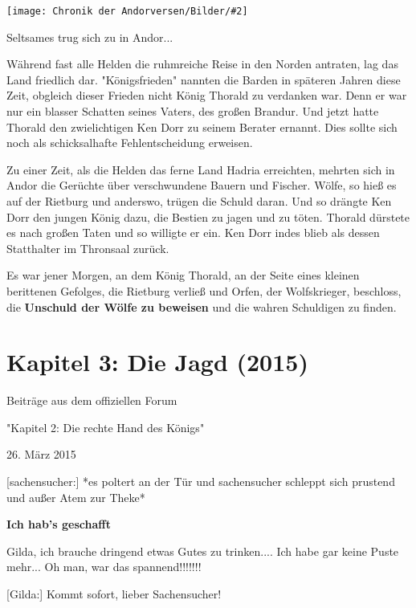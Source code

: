 \documentclass[10pt, a4paper, oneside]{book}
\newcommand{\fillbreak}{\vspace*{\fill}\columnbreak}
\newcommand{\storytext}[1]{%
    \section{#1}%
    \label{Storytext: #1}%
}
\newcommand{\bildmitts}[2][height=0.32\textwidth,width=0.48\textwidth,keepaspectratio]{%
    \begin{center}
        \texttt{[image: Chronik der Andorversen/Bilder/\#2]}
    \end{center}
}
\begin{document}
\begin{multicols}{2}
\bildmitts{AA2015 Die Jagd 1.jpeg}



Seltsames trug sich zu in Andor...\bigskip

Während fast alle Helden die ruhmreiche Reise in den Norden antraten, lag das Land friedlich dar. "Königsfrieden" nannten die Barden in späteren Jahren diese Zeit, obgleich dieser Frieden nicht König Thorald zu verdanken war. Denn er war nur ein blasser Schatten seines Vaters, des großen Brandur. Und jetzt hatte Thorald den zwielichtigen Ken Dorr zu seinem Berater ernannt. Dies sollte sich noch als schicksalhafte Fehlentscheidung erweisen.\bigskip

Zu einer Zeit, als die Helden das ferne Land Hadria erreichten, mehrten sich in Andor die Gerüchte über verschwundene Bauern und Fischer. Wölfe, so hieß es auf der Rietburg und anderswo, trügen die Schuld daran. Und so drängte Ken Dorr den jungen König dazu, die Bestien zu jagen und zu töten. Thorald dürstete es nach großen Taten und so willigte er ein. Ken Dorr indes blieb als dessen Statthalter im Thronsaal zurück.\bigskip

Es war jener Morgen, an dem König Thorald, an der Seite eines kleinen berittenen Gefolges, die Rietburg verließ und Orfen, der Wolfskrieger, beschloss, die \textbf{Unschuld der Wölfe zu beweisen} und die wahren Schuldigen zu finden.












\fillbreak
\storytext{Kapitel 3: Die Jagd (2015)}








\begin{center}
    Beiträge aus dem offiziellen Forum
    
    "Kapitel 2: Die rechte Hand des Königs"
    
    26. März 2015
\end{center}

[sachensucher:] *es poltert an der Tür und sachensucher schleppt sich prustend und außer Atem zur Theke*

\textbf{Ich hab's geschafft}

Gilda, ich brauche dringend etwas Gutes zu trinken.... Ich habe gar keine Puste mehr... Oh man, war das spannend!!!!!!!

[Gilda:] Kommt sofort, lieber Sachensucher!


\end{multicols}
\end{document}
